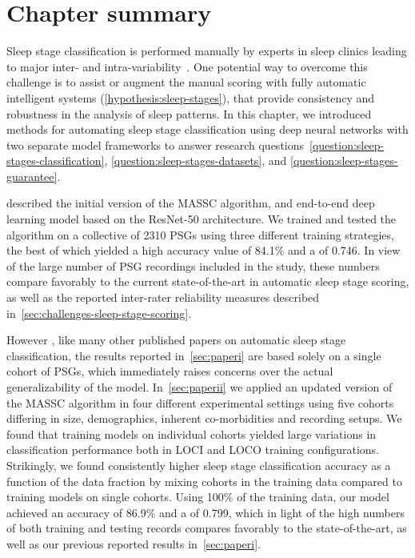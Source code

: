 \section{Chapter summary}\label{sec:sleep-stage-classification:summary}

Sleep%
stage classification is performed manually by experts in sleep clinics leading to major inter- and intra-variability~\cite{Norman2000,Rosenberg2013,Younes2017,Younes2016,Younes2018}.
One potential way to overcome this challenge is to assist or augment the manual scoring with fully automatic intelligent systems (\ref{hypothesis:sleep-stages}), that provide consistency and robustness in the analysis of sleep patterns.
In this chapter, we introduced methods for automating sleep stage classification using deep neural networks with two separate model frameworks to answer research questions~\ref{question:sleep-stages-classification}, \ref{question:sleep-stages-datasets}, and \ref{question:sleep-stages-guarantee}.

\graffito{\ref{question:sleep-stages-classification}: \questionSleepStageClassification} described the initial version of the \ac{MASSC} algorithm, and end-to-end deep learning model based on the ResNet-50 architecture. 
We trained and tested the algorithm on a collective of 2310 \acp{PSG} using three different training strategies, the best of which yielded a high accuracy value of 84.1\% and a \cohen of 0.746.
In view of the large number of \ac{PSG} recordings included in the study, these numbers compare favorably to the current state-of-the-art in automatic sleep stage scoring, as well as the reported inter-rater reliability measures described in~\cref{sec:challenges-sleep-stage-scoring}.

However%
\graffito{\ref{question:sleep-stages-datasets}: \questionSleepStageDatasets}, %
like many other published papers on automatic sleep stage classification, the results reported in~\cref{sec:paperi} are based solely on a single cohort of \acp{PSG}, which immediately raises concerns over the actual generalizability of the model.
In~\cref{sec:paperii} we applied an updated version of the \ac{MASSC} algorithm in four different experimental settings using five cohorts differing in size, demographics, inherent co-morbidities and recording setups.
We found that training models on individual cohorts yielded large variations in classification performance both in \ac{LOCI} and \ac{LOCO} training configurations. 
Strikingly, we found consistently higher sleep stage classification accuracy as a function of the data fraction by mixing cohorts in the training data compared to training models on single cohorts.
Using 100\% of the training data, our model achieved an accuracy of 86.9\% and a \cohen of 0.799, which in light of the high numbers of both training and testing records compares favorably to the state-of-the-art, as well as our previous reported results in~\cref{sec:paperi}.

